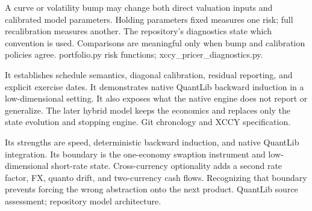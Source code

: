 {A curve or volatility bump may change both direct valuation inputs and calibrated model parameters.}
{Holding parameters fixed measures one risk; full recalibration measures another.}
{The repository's diagnostics state which convention is used.}
{Comparisons are meaningful only when bump and calibration policies agree.}
{portfolio.py risk functions; xccy\_pricer\_diagnostics.py.}

{It establishes schedule semantics, diagonal calibration, residual reporting, and explicit exercise dates.}
{It demonstrates native QuantLib backward induction in a low-dimensional setting.}
{It also exposes what the native engine does not report or generalize.}
{The later hybrid model keeps the economics and replaces only the state evolution and stopping engine.}
{Git chronology and XCCY specification.}

{Its strengths are speed, deterministic backward induction, and native QuantLib integration.}
{Its boundary is the one-economy swaption instrument and low-dimensional short-rate state.}
{Cross-currency optionality adds a second rate factor, FX, quanto drift, and two-currency cash flows.}
{Recognizing that boundary prevents forcing the wrong abstraction onto the next product.}
{QuantLib source assessment; repository model architecture.}
